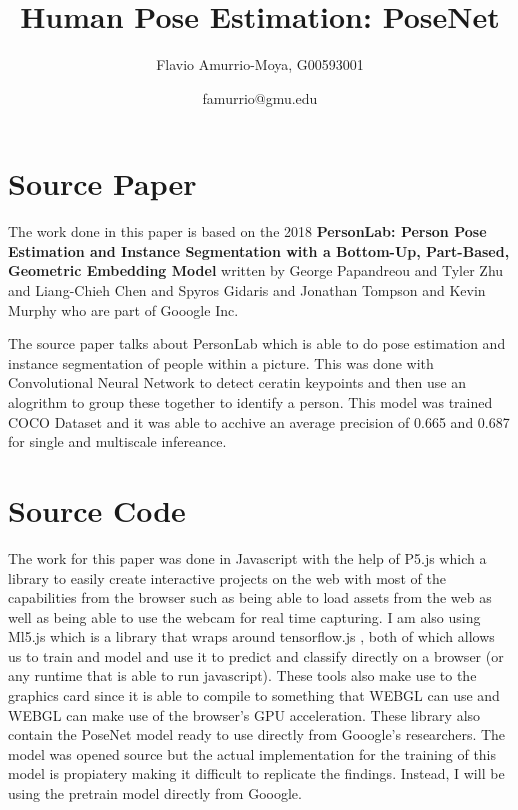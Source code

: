 \documentclass[12pt]{extarticle}
\title{Human Pose Estimation: PoseNet}
\author{Flavio Amurrio-Moya, G00593001}
\date{famurrio@gmu.edu}
\begin{document}
\maketitle

\newpage


\section{Source Paper}
The work done in this paper is based on the 2018 \textbf{PersonLab: Person Pose Estimation and Instance
  Segmentation with a Bottom-Up, Part-Based, Geometric Embedding Model} \cite{papandreou2018personlab}
written by George Papandreou and Tyler Zhu and Liang-Chieh Chen and Spyros Gidaris and Jonathan Tompson and Kevin Murphy
who are part of Gooogle Inc.

The source paper \cite{papandreou2018personlab} talks about PersonLab which is able
to do pose estimation and instance segmentation of people within a picture. This was
done with Convolutional Neural Network  to detect ceratin keypoints and then use
an alogrithm to group these together to identify a person. This model was trained
COCO Dataset \cite{lin2015microsoft} and it was able to acchive an average precision
of 0.665 and 0.687 for single and multiscale infereance\cite{papandreou2018personlab}.

\section{Source Code}
The work for this paper was done in Javascript with the help of P5.js \cite{p5js}
which a library to easily create interactive projects on the web with most of
the capabilities from the browser such as being able to load assets from the web
as well as being able to use the webcam for real time capturing. I am also using
Ml5.js\cite{ml5js} which is a library that wraps around tensorflow.js
\cite{tensorflowjs}, both of which allows us to train and model and use it to
predict and classify directly on a browser (or any runtime that is able to run javascript).
These tools also make use to the graphics card since it is able to compile to
something that WEBGL can use and WEBGL can make use of the browser's GPU acceleration.
These library also contain the PoseNet model ready to use directly from Gooogle's
researchers. The model was opened source but the actual implementation for the
training of this model is propiatery making it difficult to replicate the findings.
Instead, I will be using the pretrain model directly from Gooogle.
\end{document}
